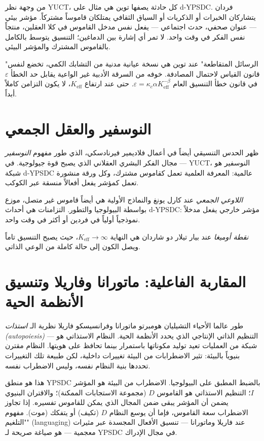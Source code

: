 \documentclass[12pt,a4paper]{article}
\begin{document}
	من وجهة نظر YUCT، كل حادثة يصفها توين هي مثال على d-YPSDC. فردان يتشاركان الخبرات أو الذكريات أو السياق الثقافي يمتلكان قاموساً مشتركاً. مؤشر بيئي — عنوان صحفي، حدث اجتماعي — يفعل نفس مدخل القاموس في كلا العقلين، منتجاً نفس الفكر في وقت واحد. لا تمر أي إشارة بين الدماغين؛ التنسيق يتوسط بالكامل بالقاموس المشترك والمؤشر البيئي.
	
	"الرسائل المتقاطعة" عند توين هي نسخة عيانية مدنية من التشابك الكمي، تخضع لنفس قانون القياس لاحتمال المصادفة. خوفه من السرقة الأدبية غير الواعية يقابل حد الخطأ \(\varepsilon\) في قانون خطأ التنسيق العام \(\varepsilon = \kappa_c \alpha K_{\mathrm{eff}}^{-\beta}\). حتى عند ارتفاع \(K_{\mathrm{eff}}\)، لا يكون التزامن كاملاً أبداً.
	
	\section{النوسفير والعقل الجمعي}
	
	ظهر الحدس التنسيقي أيضاً في أعمال فلاديمير فيرنادسكي، الذي طور مفهوم \emph{النوسفير} — مجال الفكر البشري العقلاني الذي يصبح قوة جيولوجية. في YUCT، النوسفير هو شبكة d-YPSDC عالمية: المعرفة العلمية تعمل كقاموس مشترك، وكل ورقة منشورة تعمل كمؤشر يفعل أفعالاً منسقة عبر الكوكب.
	
	\emph{اللاوعي الجمعي} عند كارل يونغ والنماذج الأولية هي أيضاً قاموس غير متصل، موزع بواسطة البيولوجيا والتطور. التزامنات هي أحداث d-YPSDC: مؤشر خارجي يفعل مدخلاً نموذجياً أولياً في فردين أو أكثر في وقت واحد.
	
	\emph{نقطة أوميغا} عند بيار تيلار دو شاردان هي النهاية \(K_{\mathrm{eff}} \to \infty\)، حيث يصبح التنسيق تاماً ويصل الكون إلى حالة كاملة من الوعي الذاتي.
	
	\section{المقاربة الفاعلية: ماتورانا وفاريلا وتنسيق الأنظمة الحية}
	
	طور عالما الأحياء التشيليان هومبرتو ماتورانا وفرانسيسكو فاريلا نظرية الـ \emph{استذات (autopoiesis)} — التنظيم الذاتي الإنتاجي الذي يحدد الأنظمة الحية. النظام الاستذاتي هو شبكة من العمليات تعيد توليد مكوناتها باستمرار بينما تحافظ على هويتها. النظام مقترن بنيوياً بالبيئة: تثير الاضطرابات من البيئة تغييرات داخلية، لكن طبيعة تلك التغييرات تحددها بنية النظام نفسه، وليس الاضطراب نفسه.
	
	هذا هو منطق YPSDC بالضبط المطبق على البيولوجيا. الاضطراب من البيئة هو المؤشر \(I\)؛ التنظيم الاستذاتي هو القاموس \(D\) (مجموعة الاستجابات الممكنة)؛ والاقتران البنيوي يضمن أن المؤشر يبقى ضمن المجال الذي يمكن للقاموس تفسيره. إذا تجاوز الاضطراب سعة القاموس، فإما أن يوسع النظام \(D\) (تكيف) أو يتفكك (موت). مفهوم "التلغيم" (languaging) عند فاريلا وماتورانا — تنسيق الأفعال المجسدة عبر مثيرات معجمية — هو صياغة صريحة لـ YPSDC في مجال الإدراك.
	
\end{document}
